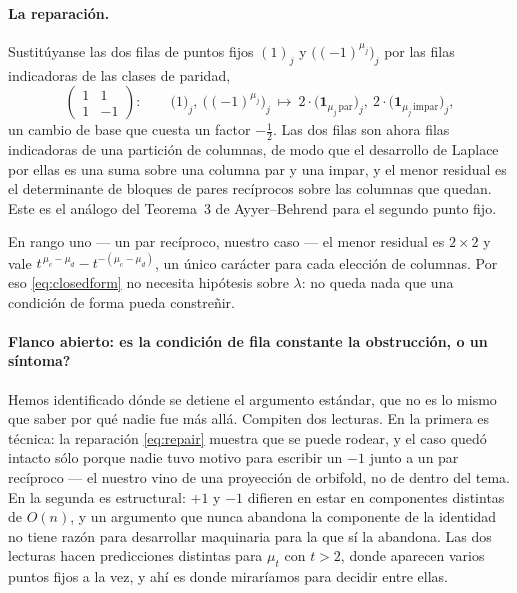 \documentclass[11pt,a4paper]{article}
\begin{document}
\paragraph{La reparaci\'on.} Sustit\'uyanse las dos filas de puntos fijos $(1)_j$ y
$\big((-1)^{\mu_j}\big)_j$ por las filas indicadoras de las clases de paridad,
\begin{equation}\label{eq:repair}
\begin{pmatrix}1&1\\1&-1\end{pmatrix}:\qquad
\big(1\big)_j,\ \big((-1)^{\mu_j}\big)_j\ \longmapsto\
2\cdot\big(\mathbf 1_{\mu_j\,\mathrm{par}}\big)_j,\ 2\cdot\big(\mathbf 1_{\mu_j\,\mathrm{impar}}\big)_j,
\end{equation}
un cambio de base que cuesta un factor $-\tfrac12$. Las dos filas son ahora filas indicadoras
de una partici\'on de columnas, de modo que el desarrollo de Laplace por ellas es una suma
sobre una columna par y una impar, y el menor residual es el determinante de bloques de pares
rec\'iprocos sobre las columnas que quedan. Este es el an\'alogo del Teorema~3 de
Ayyer--Behrend para el segundo punto fijo.

En rango uno --- un par rec\'iproco, nuestro caso --- el menor residual es $2\times2$ y vale
$t^{\,\mu_c-\mu_d}-t^{-(\mu_c-\mu_d)}$, un \'unico car\'acter para cada elecci\'on de columnas.
Por eso \eqref{eq:closedform} no necesita hip\'otesis sobre $\lambda$: no queda nada que una
condici\'on de forma pueda constre\~nir.

\paragraph{Flanco abierto: \textquestiondown es la condici\'on de fila constante la
obstrucci\'on, o un s\'intoma?} Hemos identificado d\'onde se detiene el argumento est\'andar,
que no es lo mismo que saber por qu\'e nadie fue m\'as all\'a. Compiten dos lecturas. En la
primera es t\'ecnica: la reparaci\'on \eqref{eq:repair} muestra que se puede rodear, y el caso
qued\'o intacto s\'olo porque nadie tuvo motivo para escribir un $-1$ junto a un par
rec\'iproco --- el nuestro vino de una proyecci\'on de orbifold, no de dentro del tema. En la
segunda es estructural: $+1$ y $-1$ difieren en estar en componentes distintas de $O(n)$, y un
argumento que nunca abandona la componente de la identidad no tiene raz\'on para desarrollar
maquinaria para la que s\'i la abandona. Las dos lecturas hacen predicciones distintas para
$\mu_t$ con $t>2$, donde aparecen varios puntos fijos a la vez, y ah\'i es donde mirar\'iamos
para decidir entre ellas.
\end{document}
